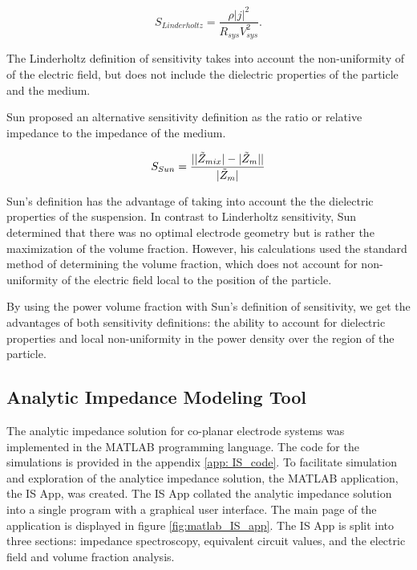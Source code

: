 \begin{equation}
    S_{Linderholtz} = \frac{\rho |j|^2}{R_{sys}V_{sys}^2}.
    \label{eqn:Linderholtz}
\end{equation}

\noindent The Linderholtz definition of sensitivity takes into account the non-uniformity of of the electric field, but does not include the dielectric properties of the particle and the medium.

\par Sun proposed an alternative sensitivity definition as the ratio or relative impedance to the impedance of the medium.

\begin{equation}
    S_{Sun} = \frac{| |\Tilde{Z}_{mix}| - |\Tilde{Z}_m| |}{|\Tilde{Z}_m|}
\end{equation}

\par Sun's definition has the advantage of taking into account the the dielectric properties of the suspension. In contrast to Linderholtz sensitivity, Sun determined that there was no optimal electrode geometry but is rather the maximization of the volume fraction. However, his calculations used the standard method of determining the volume fraction, which does not account for non-uniformity of the electric field local to the position of the particle. 

\par By using the power volume fraction with Sun's definition of sensitivity, we get the advantages of both sensitivity definitions: the ability to account for dielectric properties and local non-uniformity in the power density over the region of the particle.

\subsection{Analytic Impedance Modeling Tool}

\par The analytic impedance solution for co-planar electrode systems was implemented in the MATLAB programming language. The code for the simulations is provided in the appendix \ref{app: IS_code}. To facilitate simulation and exploration of the analytice impedance solution, the MATLAB application, the IS App, was created. The IS App collated the analytic impedance solution into a single program with a graphical user interface. The main page of the application is displayed in figure \ref{fig:matlab_IS_app}. The IS App is split into three sections: impedance spectroscopy, equivalent circuit values, and the electric field and volume fraction analysis. 

